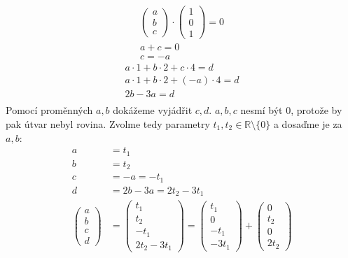 \documentclass[12pt]{article}
\begin{document}
\begin{enumerate}
\begin{enumerate}
        \begin{align*}
          \begin{pmatrix}
            a \\ b \\ c
          \end{pmatrix} \cdot
          \begin{pmatrix}
            1 \\ 0 \\ 1
          \end{pmatrix}
          = 0 \\
          a+c = 0 \\
          c = -a
      \end{align*}
      \begin{align*}
        a\cdot1 + b\cdot2 + c\cdot4 = d \\
        a\cdot1 + b\cdot2 + (-a)\cdot4 = d \\
        2b - 3a = d \\
      \end{align*}
      Pomocí proměnných $a,b$ dokážeme vyjádřit $c,d$. $a,b,c$ nesmí být 0, protože by pak útvar nebyl rovina.
      Zvolme tedy parametry $t_1,t_2 \in \mathbb{R} \setminus \{0\}$ a dosaďme je za $a,b$:
      \begin{align*}
        a&=t_1 \\
        b&=t_2 \\
        c&=-a=-t_1 \\
        d&=2b-3a=2t_2-3t_1 \\
        \begin{pmatrix}
          a \\ b \\ c \\ d
        \end{pmatrix} &=
        \begin{pmatrix}
          t_1 \\ t_2 \\ -t_1 \\ 2t_2-3t_1
        \end{pmatrix} =
        \begin{pmatrix}
          t_1 \\ 0 \\ -t_1 \\ -3t_1
        \end{pmatrix} +
        \begin{pmatrix}
          0 \\ t_2 \\ 0 \\ 2t_2

\end{pmatrix}
\end{align*}
\end{enumerate}
\end{enumerate}
\end{document}
